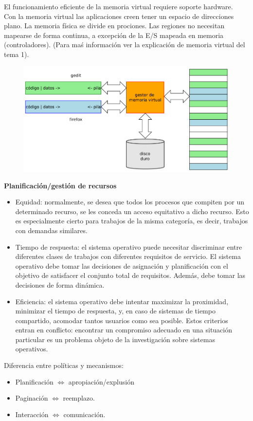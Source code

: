 \documentclass{article}
\begin{document}
El funcionamiento eficiente de la memoria virtual requiere soporte hardware.\\

Con la memoria virtual las aplicaciones creen tener un espacio de direcciones plano. La memoria física se divide en prociones. Las regiones no necesitan mapearse de forma continua, a excepción de la E/S mapeada en memoria (controladores). (Para maś información ver la explicación de memoria virtual del tema 1).

\begin{figure}[h]
\centering
\includegraphics[scale=1, width=\textwidth]{mem_virtual.png}
\end{figure}

\textbf{Planificación/gestión de recursos}

\begin{itemize}
\item Equidad: normalmente, se desea que todos los procesos que compiten por un determinado recurso, se les conceda un acceso equitativo a dicho recurso. Esto es especialmente cierto para trabajos de la misma categoría, es decir, trabajos con demandas similares.

\item Tiempo de respuesta: el sistema operativo puede necesitar discriminar entre diferentes clases de trabajos con diferentes requisitos de servicio. El sistema operativo debe tomar las decisiones de asignación y planificación con el objetivo de satisfacer el conjunto total de requisitos. Además, debe tomar las decisiones de forma dinámica. 

\item Eficiencia: el sistema operativo debe intentar maximizar la proximidad, minimizar el tiempo de respuesta, y, en caso de sistemas de tiempo compartido, acomodar tantos usuarios como sea posible. Estos criterios entran en conflicto: encontrar un compromiso adecuado en una situación particular es un problema objeto de la investigación sobre sistemas operativos.
\end{itemize}

Diferencia entre políticas y mecanismos:
\begin{itemize}
\item Planificación $\Leftrightarrow$ apropiación/explusión

\item Paginación $\Leftrightarrow$ reemplazo.

\item Interacción $\Leftrightarrow$ comunicación.
\end{itemize}
\end{document}
